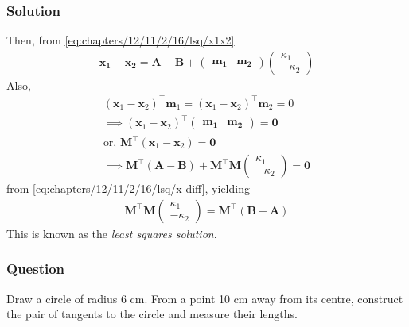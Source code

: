 \documentclass{beamer}
\providecommand{\brak}[1]{\ensuremath{\left(#1\right)}}
\theoremstyle{remark}
\newcommand{\myvec}[1]{\ensuremath{\begin{pmatrix}#1\end{pmatrix}}}
\let\vec\mathbf
\begin{document}
\begin{frame}
\frametitle{Solution}
Then, 
	    from \eqref{eq:chapters/12/11/2/16/lsq/x1x2}
\begin{align}
\vec{x_1} - \vec{x_2} =
	 \vec{A}-\vec{B}+
 \myvec{\vec{m_1} & \vec{m_2}}\myvec{\kappa_1\\-\kappa_2}
	\label{eq:chapters/12/11/2/16/lsq/x-diff}
\end{align}
Also, 
    \begin{align}
	    \brak{\vec{x}_1 -\vec{x}_2}^\top\vec{m}_1
	    =
	    \brak{\vec{x}_1 -\vec{x}_2}^\top\vec{m}_2
	    =0
	    \\
	    \implies 
	    \brak{\vec{x}_1 -\vec{x}_2}^\top\myvec{\vec{m_1} & \vec{m_2}} = \vec{0}
	    \\
	    \text{or, }	    \vec{M}^\top\brak{\vec{x}_1 -\vec{x}_2} = \vec{0}
	    \\
	    \implies \vec{M}^\top
	    \brak{\vec{A}-\vec{B}}+
 \vec{M}^\top\vec{M}\myvec{\kappa_1\\-\kappa_2} = \vec{0}
	    \label{eq:chapters/12/11/2/16/lsq/m-orth}
    \end{align}
	    from 
	\eqref{eq:chapters/12/11/2/16/lsq/x-diff},
	yielding
    \begin{align}
	    \vec{M}^\top\vec{M}\myvec{\kappa_1\\-\kappa_2} = \vec{M}^\top\brak{\vec{B}-\vec{A}}
        \label{eq:chapters/12/11/2/16/lsq/vec-eqn}
    \end{align}
    This is known as the {\em least squares solution}.
\end{frame}
\begin{frame}
\frametitle{Question}
Draw a circle of radius 6 cm. From a point 10 cm away from its centre, construct the pair of tangents to the circle and measure their lengths.
\end{frame}
\end{document}
